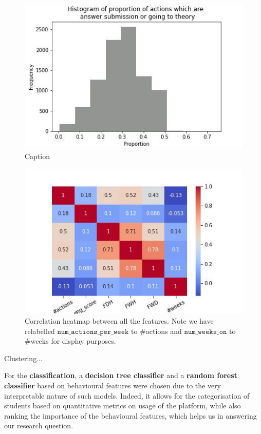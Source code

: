 \documentclass[sigplan,screen]{acmart}
\begin{document}
\begin{figure}
    \centering
    \includegraphics[width=\linewidth]{reports/figures/eng_score_hist.jpg}
    \caption{Caption}
    \label{fig:eng_score}
\end{figure}


\begin{figure}
    \centering
    \includegraphics[width=\linewidth]{reports/figures/feature_corr.jpg}
    \caption{Correlation heatmap between all the features. Note we have relabelled $\texttt{num\_actions\_per\_week}$ to \#actions and $\texttt{num\_weeks\_on}$ to \#weeks for display purposes.}
    \label{fig:feature_corr}
\end{figure}


{\color{red}Clustering...}

For the \textbf{classification}, a \textbf{decision tree classifier} and a \textbf{random forest classifier} based on behavioural features were chosen due to the very interpretable nature of such models. Indeed, it allows for the categorisation of students based on quantitative metrics on usage of the platform, while also ranking the importance of the behavioural features, which helps us in answering our research question. 
\end{document}
